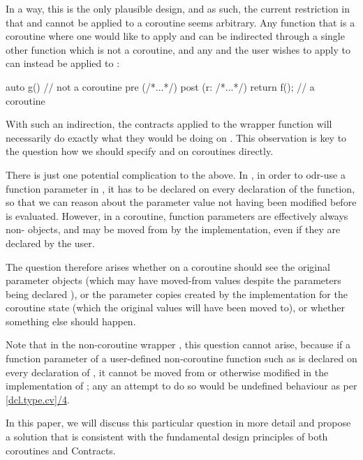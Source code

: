 In a way, this is the only plausible design, and as such, the current restriction in \cite{P2900R8} that  and  cannot be applied to a coroutine seems arbitrary. Any function  that is a coroutine where one would like to apply  and  can be indirected through a single other function  which is not a coroutine, and any  and  the user wishes to apply to  can instead be applied to :
\begin{codeblock}
auto g()  // not a coroutine
  pre (/*...*/) 
  post (r: /*...*/) 
{ 
  return f();  // a coroutine
} 
\end{codeblock}
With such an indirection, the contracts applied to the wrapper function  will necessarily do exactly what they would be doing on . This observation is key to the question how we should specify  and  on coroutines directly. 

There is just one potential complication to the above. In \cite{P2900R8}, in order to odr-use a function parameter in , it has to be declared  on every declaration of the function, so that we can reason about the parameter value not having been modified before  is evaluated. However, in a coroutine, function parameters are effectively always non- objects, and may be moved from by the implementation, even  if they are declared  by the user.

The question therefore arises whether  on a coroutine should see the original parameter objects (which may have moved-from values despite the parameters being declared ), or the parameter copies created by the implementation for the coroutine state (which the original values will have been moved to), or whether something else should happen.

Note that in the non-coroutine wrapper , this question cannot arise, because if a function parameter of a user-defined non-coroutine function such as  is declared  on every declaration of , it cannot be moved from or otherwise modified in the implementation of ; any an attempt to do so would be undefined behaviour as per \href{https://eel.is/c++draft/dcl.type.cv#4.sentence-1}{[dcl.type.cv]/4}.

In this paper, we will discuss this particular question in more detail and propose a solution that is consistent with the fundamental design principles of both coroutines and Contracts.

